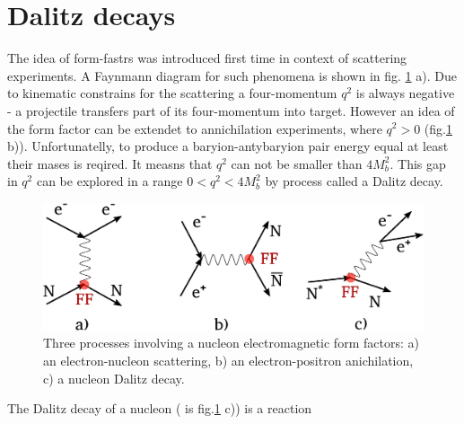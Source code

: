 \section{Dalitz decays}
The idea of form-fastrs was introduced first time in context of scattering experiments. A Faynmann diagram for such phenomena is shown in fig. \ref{fig:FF_kinds} a). Due to kinematic constrains for the scattering a four-momentum $q^2$ is always negative - a projectile transfers part of its four-momentum into target. However an idea of the form factor can be extendet to annichilation experiments, where $q^2>0$ (fig.\ref{fig:FF_kinds} b)). Unfortunatelly, to produce a baryion-antybaryion pair energy equal at least their mases is reqired. It measns that $q^2$ can not be smaller than $4M_b^2$. This gap in $q^2$ can be explored in a range $0<q^2<4M_b^2$ by process called a Dalitz decay. 

\begin{figure}[hb]
  \centering
  \includegraphics[width=0.9 \linewidth]{Chapter_introduction/faynmannDiagrams.eps}
  \caption{Three processes involving a nucleon electromagnetic form factors: a) an electron-nucleon scattering, b) an electron-positron anichilation, c) a nucleon Dalitz decay.}
  \label{fig:FF_kinds}
\end{figure}

The Dalitz decay of a nucleon ( is fig.\ref{fig:FF_kinds} c)) is a reaction 